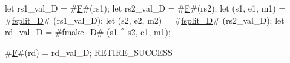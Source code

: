 let rs1_val_D    = #\hyperref[sailRISCVzF]{F}#(rs1);
let rs2_val_D    = #\hyperref[sailRISCVzF]{F}#(rs2);
let (s1, e1, m1) = #\hyperref[sailRISCVzfsplitzyD]{fsplit\_D}# (rs1_val_D);
let (s2, e2, m2) = #\hyperref[sailRISCVzfsplitzyD]{fsplit\_D}# (rs2_val_D);
let rd_val_D     = #\hyperref[sailRISCVzfmakezyD]{fmake\_D}# (s1 ^ s2, e1, m1);

#\hyperref[sailRISCVzF]{F}#(rd) = rd_val_D;
RETIRE_SUCCESS
